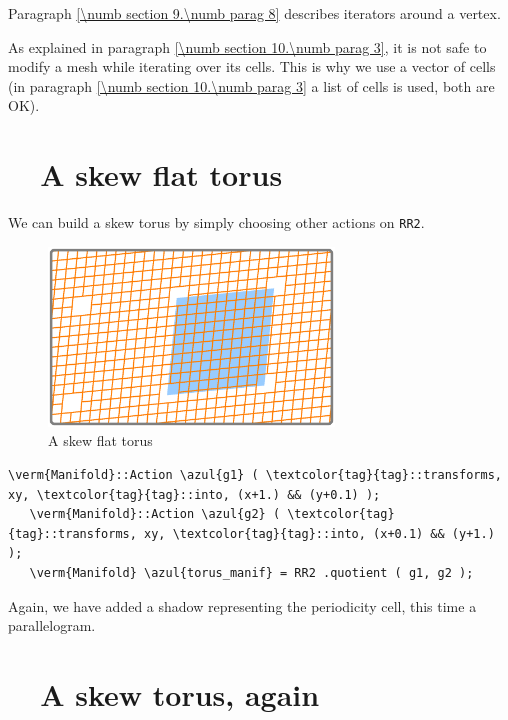 Paragraph \ref{\numb section 9.\numb parag 8} describes iterators around a vertex.

As explained in paragraph \ref{\numb section 10.\numb parag 3}, it is not safe to
modify a mesh while iterating over its cells.
This is why we use a vector of cells (in paragraph \ref{\numb section 10.\numb parag 3}
a list of cells is used, both are OK).

\section{~~A skew flat torus}\label{\numb section 7.\numb parag 7}

We can build a skew torus by simply choosing other actions on {\small\tt RR2}.

\begin{figure}[ht] \centering
  \includegraphics[width=76mm]{flat-torus-3.eps}
  \caption{A skew flat torus}
  \label{\numb section 7.\numb fig 3}
\end{figure}

\begin{Verbatim}[commandchars=\\\{\},formatcom=\small\tt,frame=single,
   label=parag-\ref{\numb section 7.\numb parag 7}.cpp,rulecolor=\color{coment},
   baselinestretch=0.94,framesep=2mm                                            ]
   \verm{Manifold}::Action \azul{g1} ( \textcolor{tag}{tag}::transforms, xy, \textcolor{tag}{tag}::into, (x+1.) && (y+0.1) );
   \verm{Manifold}::Action \azul{g2} ( \textcolor{tag}{tag}::transforms, xy, \textcolor{tag}{tag}::into, (x+0.1) && (y+1.) );
   \verm{Manifold} \azul{torus_manif} = RR2 .quotient ( g1, g2 );
\end{Verbatim}

Again, we have added a shadow representing the periodicity cell, this time a parallelogram.


\section{~~A skew torus, again}\label{\numb section 7.\numb parag 8}

